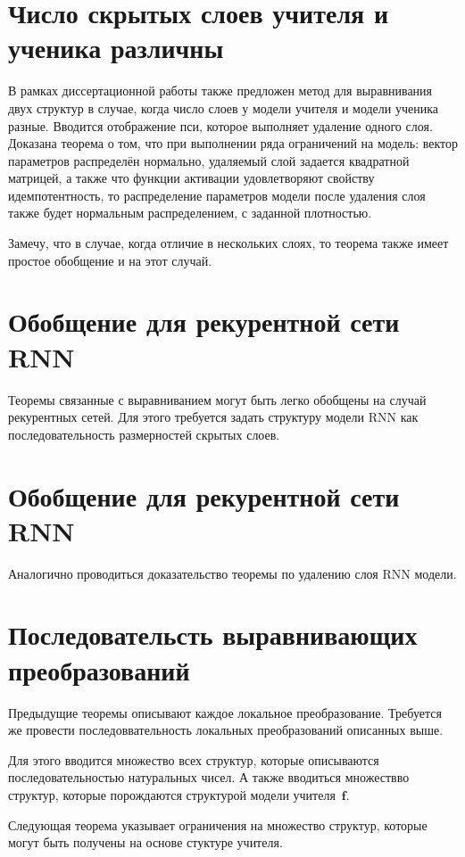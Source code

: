 \documentclass[10pt, twoside]{article}
\begin{document}
\section{Число скрытых слоев учителя и ученика различны}
В рамках диссертационной работы также предложен метод для выравнивания двух структур в случае, когда число слоев у модели учителя и модели ученика разные.
Вводится отображение пси, которое выполняет удаление одного слоя.
Доказана теорема о том, что при выполнении ряда ограничений на модель: вектор параметров распределён нормально, удаляемый слой задается квадратной матрицей, а также что функции активации удовлетворяют свойству идемпотентность, то распределение параметров модели после удаления слоя также будет нормальным распределением, с заданной плотностью.

Замечу, что в случае, когда отличие в нескольких слоях, то теорема также имеет простое обобщение и на этот случай.

\section{Обобщение для рекурентной сети RNN}

Теоремы связанные с выравниванием могут быть легко обобщены на случай рекурентных сетей. Для этого требуется задать структуру модели RNN как последовательность размерностей скрытых слоев.

\section{Обобщение для рекурентной сети RNN}

Аналогично проводиться доказательство теоремы по удалению слоя RNN модели.

\section{Последовательсть выравнивающих преобразований}

Предыдущие теоремы описывают каждое локальное преобразование. Требуется же провести последоввательность локальных преобразований описанных выше.

Для этого вводится множество всех структур, которые описываются последовательностью натуральных чисел. А также вводиться множествво структур, которые порождаются структурой модели учителя~$\mathbf{f}$.

Следующая теорема указывает ограничения на множество структур, которые могут быть получены на основе стуктуре учителя.
\end{document}

